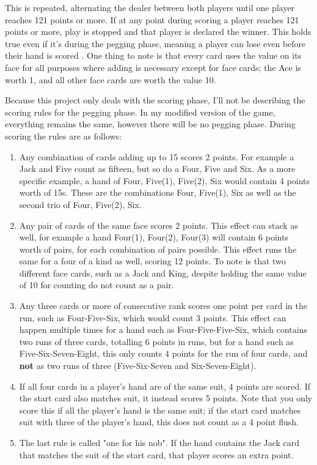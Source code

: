 \documentclass[]{article}
\begin{document}
This is repeated, alternating the dealer between both players until one player reaches 121 points or more. If at any point during scoring a player reaches 121 points or more, play is stopped and that player is declared the winner. This holds true even if it's during the pegging phase, meaning a player can lose even before their hand is scored \cite{cribbage_rules}\cite{cribbage_rules_montana}. One thing to note is that every card uses the value on its face for all purposes where adding is necessary except for face cards; the Ace is worth 1, and all other face cards are worth the value 10. 

Because this project only deals with the scoring phase, I'll not be describing the scoring rules for the pegging phase. In my modified version of the game, everything remains the same, however there will be no pegging phase. During scoring the rules are as follows: 

\begin{enumerate}
    \item Any combination of cards adding up to 15 scores 2 points. For example a Jack and Five count as fifteen, but so do a Four, Five and Six. As a more specific example, a hand of Four, Five(1), Five(2), Six would contain 4 points worth of 15s. These are the combinations Four, Five(1), Six as well as the second trio of Four, Five(2), Six. 
    \item Any pair of cards of the same face scores 2 points. This effect can stack as well, for example a hand Four(1), Four(2), Four(3) will contain 6 points worth of pairs, for each combination of pairs possible. This effect runs the same for a four of a kind as well, scoring 12 points. To note is that two different face cards, such as a Jack and King, despite holding the same value of 10 for counting do not count as a pair. 
    \item Any three cards or more of consecutive rank scores one point per card in the run, such as Four-Five-Six, which would count 3 points. This effect can happen multiple times for a hand such as Four-Five-Five-Six, which contains two runs of three cards, totalling 6 points in runs, but for a hand such as Five-Six-Seven-Eight, this only counts 4 points for the run of four cards, and \textbf{not} as two runs of three (Five-Six-Seven and Six-Seven-Eight). 
    \item If all four cards in a player's hand are of the same suit, 4 points are scored. If the start card also matches suit, it instead scores 5 points. Note that you only score this if all the player's hand is the same suit; if the start card matches suit with three of the player's hand, this does not count as a 4 point flush.
    \item The last rule is called "one for his nob". If the hand contains the Jack card that matches the suit of the start card, that player scores an extra point. 
\end{enumerate}
\end{document}
